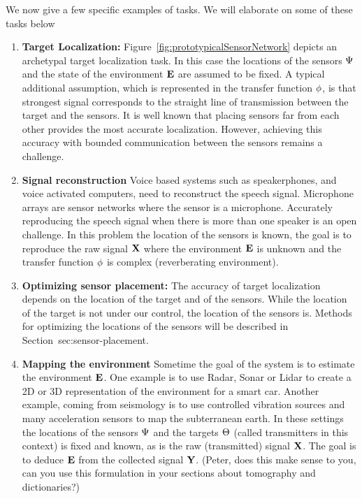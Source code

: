 \documentclass{article}
\begin{document}
We now give a few specific examples of tasks. We will elaborate on some of these tasks below
\begin{enumerate}
    \item {\bf Target Localization:}  Figure~\ref{fig:prototypicalSensorNetwork} depicts an archetypal target localization task. In this case the locations of the sensors $\Psi$ and the state of the environment $\mathbf{E}$ are assumed to be fixed. A typical additional assumption, which is represented in the transfer function $\phi$, is that strongest signal corresponds to the straight line of transmission between the target and the sensors. It is well known that placing sensors far from each other provides the most accurate localization. However, achieving this accuracy with bounded communication between the sensors remains a challenge.
    \item {\bf Signal reconstruction} Voice based systems such as speakerphones, and voice activated computers, need to reconstruct the speech signal. Microphone arrays are sensor networks where the sensor is a microphone. Accurately reproducing the speech signal when there is more than one speaker is an open challenge. In this problem the location of the sensors is known, the goal is to reproduce the raw signal $\mathbf{X}$ where the environment $\mathbf{E}$ is unknown and the transfer function $\phi$ is complex (reverberating environment).
    
    
    \item {\bf Optimizing sensor placement:} The accuracy of target localization depends on the location of the target and of the sensors. While the location of the target is not under our control, the location of the sensors is. Methods for optimizing the locations of the sensors will be described in Section~{sec:sensor-placement.}
    
    \item{\bf Mapping the environment} Sometime the goal of the system is to estimate the environment $\mathbf{E}$. One example is to use Radar, Sonar or Lidar to create a 2D or 3D representation of the environment for a smart car. Another example, coming from seismology is to use controlled vibration sources and many acceleration sensors to map the subterranean earth. In these settings the locations of the sensors $\Psi$ and the targets $\Theta$ (called transmitters in this context) is fixed and known, as is the raw (transmitted) signal $\mathbf{X}$. The goal is to deduce $\mathbf{E}$ from the collected signal $\mathbf{Y}$. (Peter, does this make sense to you, can you use this formulation in your sections about tomography and dictionaries?)
    

\end{enumerate}
\end{document}
